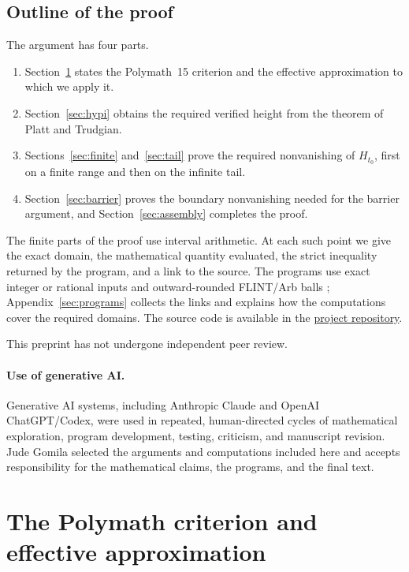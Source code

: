 \documentclass[11pt]{article}
\theoremstyle{definition}
\newcommand{\projectlink}[1]{\href{https://github.com/judegomila/dbn-lambda-01787854-candidate-audit/tree/6222740efae58d773a70ff929cf12a34932d2af0}{#1}}
\begin{document}
\subsection{Outline of the proof}\label{sec:status}

The argument has four parts.
\begin{enumerate}
\item Section~\ref{sec:criterion} states the Polymath~15 criterion and the
effective approximation to which we apply it.
\item Section~\ref{sec:hypi} obtains the required verified height from the
theorem of Platt and Trudgian.
\item Sections~\ref{sec:finite} and~\ref{sec:tail} prove the required
nonvanishing of $H_{t_0}$, first on a finite range and then on the infinite
tail.
\item Section~\ref{sec:barrier} proves the boundary nonvanishing needed for
the barrier argument, and Section~\ref{sec:assembly} completes the proof.
\end{enumerate}

The finite parts of the proof use interval arithmetic.  At each such point we
give the exact domain, the mathematical quantity evaluated, the strict
inequality returned by the program, and a link to the source.  The programs
use exact integer or rational inputs and outward-rounded FLINT/Arb balls
\cite{JohanssonArb}; Appendix~\ref{sec:programs} collects the links and explains
how the computations cover the required domains.  The source code is
available in the \projectlink{project repository}.

This preprint has not undergone independent peer review.

\paragraph{Use of generative AI.}
Generative AI systems, including Anthropic Claude and OpenAI ChatGPT/Codex,
were used in repeated, human-directed cycles of mathematical exploration,
program development, testing, criticism, and manuscript revision. Jude Gomila
selected the arguments and computations included here and accepts
responsibility for the mathematical claims, the programs, and the final text.



\section{The Polymath criterion and effective approximation}\label{sec:criterion}
\end{document}
